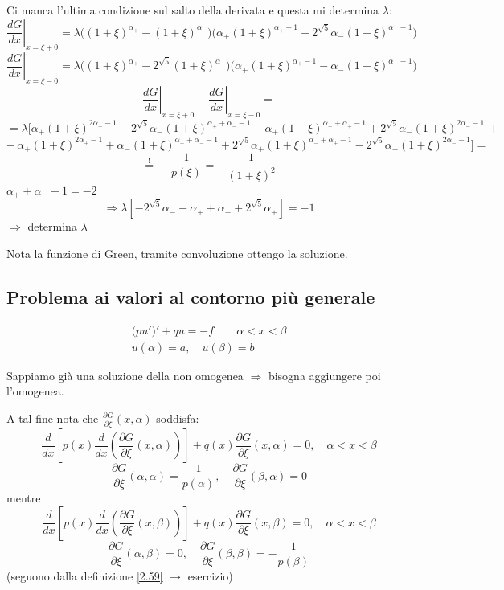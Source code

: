 \documentclass[a4paper,11pt]{report}
\begin{document}
Ci manca l'ultima condizione sul salto della derivata e questa mi determina $\lambda$:
\[
\left.\frac{dG}{dx}\right|_{x=\xi+0}=\lambda \big( (1+\xi)^{\alpha_+}-(1+\xi)^{\alpha_-}\big) \big(\alpha_+(1+\xi)^{\alpha_+ -1}-2^{\sqrt{5}}\alpha_-(1+\xi)^{\alpha_- -1}\big)
\]
\[
\left.\frac{dG}{dx}\right|_{x=\xi-0}=\lambda \big( (1+\xi)^{\alpha_+}-2^{\sqrt{5}}(1+\xi)^{\alpha_-} \big) \big(\alpha_+(1+\xi)^{\alpha_+ -1}-\alpha_-(1+\xi)^{\alpha_- -1}\big)
\]
\[
\left.\frac{dG}{dx}\right|_{x=\xi+0}-\left.\frac{dG}{dx}\right|_{x=\xi-0}=
\]
\[
=\lambda \Big[ \alpha_+ (1+\xi)^{2\alpha_+ -1}-2^{\sqrt{5}}\alpha_-(1+\xi)^{\alpha_+ + \alpha_- -1} - \alpha_+(1+\xi)^{\alpha_-+\alpha_+-1} + 2^{\sqrt{5}}\alpha_- (1+\xi)^{2\alpha_- -1}\, +
\]
\[
-\, \alpha_+(1+\xi)^{2\alpha_+ -1}+ \alpha_- (1+\xi)^{\alpha_+ + \alpha_- - 1} + 2^{\sqrt{5}}\alpha_+(1+\xi)^{\alpha_- + \alpha_+ -1}-2^{\sqrt{5}}\alpha_-(1+\xi)^{2\alpha_- -1} \Big]=
\]
\[
\overset{!}{=}-\frac{1}{p(\xi)}=-\frac{1}{(1+\xi)^2}
\]
$\alpha_+ + \alpha_- -1=-2$
\[
\Rightarrow \lambda\left[ -2^{\sqrt{5}}\alpha_- - \alpha_+ + \alpha_- + 2^{\sqrt{5}}\alpha_+\right]=-1
\]
$\Rightarrow$ determina $\lambda$

Nota la funzione di Green, tramite convoluzione ottengo la soluzione.

\subsection{Problema ai valori al contorno pi\`u generale}

\begin{equation}
\begin{gathered}
\big(pu'\big)'+qu=-f \qquad \alpha<x<\beta\\
u(\alpha)=a, \quad u(\beta)=b
\end{gathered}
\label{2.63}
\end{equation}

Sappiamo gi\`a una soluzione della non omogenea $\Rightarrow$ bisogna aggiungere poi l'omogenea.

A tal fine nota che $\frac{\partial G}{\partial \xi}(x,\alpha)$ soddisfa:
\[
\frac{d}{dx}\left[p(x)\frac{d}{dx}\left(\frac{\partial G}{\partial \xi}(x,\alpha)\right)\right]+q(x)\frac{\partial G}{\partial \xi}(x,\alpha)=0, \quad \alpha<x<\beta
\]
\[
\frac{\partial G}{\partial \xi}(\alpha,\alpha)=\frac{1}{p(\alpha)}, \quad \frac{\partial G}{\partial \xi}(\beta,\alpha)=0
\]
mentre
\[
\frac{d}{dx}\left[p(x)\frac{d}{dx}\left(\frac{\partial G}{\partial \xi}(x,\beta)\right)\right]+q(x)\frac{\partial G}{\partial \xi}(x,\beta)=0, \quad \alpha<x<\beta
\]
\[
\frac{\partial G}{\partial \xi}(\alpha,\beta)=0, \quad \frac{\partial G}{\partial \xi}(\beta,\beta)=-\frac{1}{p(\beta)}
\]
(seguono dalla definizione \eqref{2.59} $\rightarrow$ esercizio)
\end{document}

